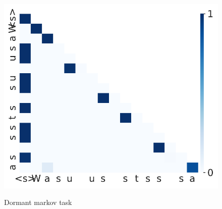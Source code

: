 \begin{figure}[t]
\begin{minipage}{0.3\textwidth}
  \end{minipage}
  \hspace{-1em}
  \begin{minipage}{0.3\textwidth}
      \centering
      \label{fig:appendix-dormant-markov-attn-weights-active}
      \vspace{-.2em}
      \includegraphics[width=\linewidth]{Figures/figures_pretraining/dormant_markov/dormant_markov_attn_weights_seq1.pdf}
  \end{minipage}
  \vspace{-1em}
  \caption{\small Dormant markov task}
  \label{figure:appendix-pretraining-dormant-markov-1}
  \vspace{-1em}
\end{figure}

